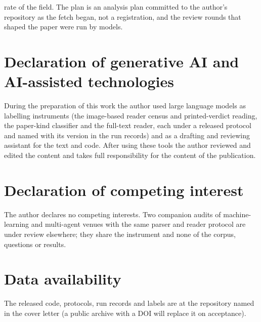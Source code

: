 \documentclass[preprint,review,12pt]{elsarticle}
\begin{document}
rate of the field. The plan is an analysis plan committed to the author's repository as the fetch began, not a registration, and the review rounds that shaped the paper were run by models.

\section*{Declaration of generative AI and AI-assisted technologies}
During the preparation of this work the author used large language models as labelling instruments (the image-based reader census and printed-verdict reading, the paper-kind classifier and the full-text reader, each under a released protocol and named with its version in the run records) and as a drafting and reviewing assistant for the text and code. After using these tools the author reviewed and edited the content and takes full responsibility for the content of the publication.

\section*{Declaration of competing interest}
The author declares no competing interests. Two companion audits of machine-learning and multi-agent venues with the same parser and reader protocol are under review elsewhere; they share the instrument and none of the corpus, questions or results.

\section*{Data availability}
The released code, protocols, run records and labels are at the repository named in the cover letter (a public archive with a DOI will replace it on acceptance).



\end{document}
